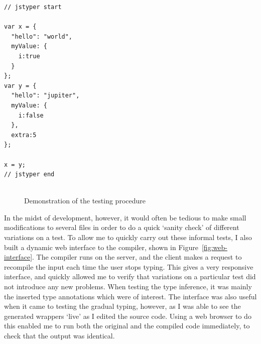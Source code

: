 \documentclass[12pt,a4paper,twoside,openright]{report}
\theoremstyle{definition}
\theoremstyle{dotless}
\begin{document}
\begin{lrbox}{}
\begin{minipage}[c][111mm]{75mm}
  \begin{verbatim}
// jstyper start

var x = {
  "hello": "world",
  myValue: {
    i:true
  }
};
var y = {
  "hello": "jupiter",
  myValue: {
    i:false  
  },
  extra:5
};

x = y;
// jstyper end


  \end{verbatim}
\end{minipage}
\end{lrbox}
\begin{figure}
\centering
{}

\caption{Demonstration of the testing procedure}
\label{fig:jasmine}
\end{figure}

In the midst of development, however, it would often be tedious to make small
modifications to several files in order to do a quick `sanity check' of
different variations on a test. To allow me to quickly carry out these informal
tests, I also built a dynamic web interface to the compiler, shown in
Figure~\ref{fig:web-interface}.  The compiler runs on the server, and the
client makes a request to recompile the input each time the user stops typing.
This gives a very responsive interface, and quickly allowed me to verify that
variations on a particular test did not introduce any new problems. When
testing the type inference, it was mainly the inserted type annotations which
were of interest. The interface was also useful when it came to testing the
gradual typing, however, as I was able to see the generated wrappers `live' as
I edited the source code. Using a web browser to do this enabled me to run both
the original and the compiled code immediately, to check that the output was
identical.
\end{document}
